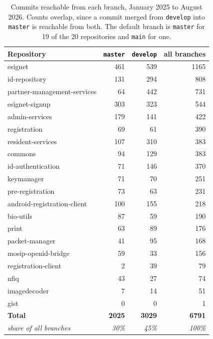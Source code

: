 \begin{table}[htbp]
\centering
\caption{Commits reachable from each branch, January 2025 to August 2026.
Counts overlap, since a commit merged from \texttt{develop} into
\texttt{master} is reachable from both. The default branch is \texttt{master}
for 19 of the 20 repositories and \texttt{main} for one.}
\label{tab:branches}
\small
\begin{tabular}{@{}lrrr@{}}
\toprule
Repository & \texttt{master} & \texttt{develop} & all branches \\
\midrule
esignet                     & 461 & 539 & 1165 \\
id-repository               & 131 & 294 &  808 \\
partner-management-services &  64 & 442 &  731 \\
esignet-signup              & 303 & 323 &  544 \\
admin-services              & 179 & 141 &  422 \\
registration                &  69 &  61 &  390 \\
resident-services           & 107 & 310 &  383 \\
commons                     &  94 & 129 &  383 \\
id-authentication           &  71 & 146 &  370 \\
keymanager                  &  71 &  70 &  251 \\
pre-registration            &  73 &  63 &  231 \\
android-registration-client & 100 & 155 &  218 \\
bio-utils                   &  87 &  59 &  190 \\
print                       &  63 &  89 &  176 \\
packet-manager              &  41 &  95 &  168 \\
mosip-openid-bridge         &  59 &  33 &  156 \\
registration-client         &   2 &  39 &   79 \\
nfiq                        &  43 &  27 &   74 \\
imagedecoder                &   7 &  14 &   51 \\
gist                        &   0 &   0 &    1 \\
\midrule
\textbf{Total} & \textbf{2025} & \textbf{3029} & \textbf{6791} \\
\textit{share of all branches} & \textit{30\%} & \textit{45\%} & \textit{100\%} \\
\bottomrule
\end{tabular}
\end{table}

